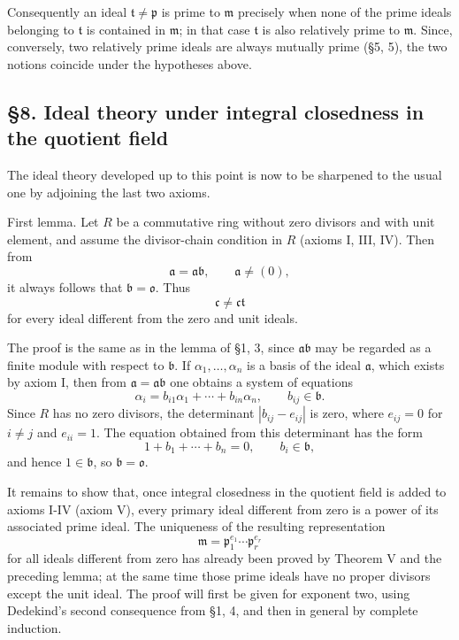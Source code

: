 \documentclass[
  12pt,
]{article}
\begin{document}
Consequently an ideal \(\mathfrak t\ne\mathfrak p\) is prime to
\(\mathfrak m\) precisely when none of the prime ideals belonging to
\(\mathfrak t\) is contained in \(\mathfrak m\); in that case
\(\mathfrak t\) is also relatively prime to \(\mathfrak m\). Since,
conversely, two relatively prime ideals are always mutually prime (§5,
5), the two notions coincide under the hypotheses above.

\subsection{§8. Ideal theory under integral closedness in the quotient
field}\label{ideal-theory-under-integral-closedness-in-the-quotient-field}

The ideal theory developed up to this point is now to be sharpened to
the usual one by adjoining the last two axioms.

First lemma. Let \(R\) be a commutative ring without zero divisors and
with unit element, and assume the divisor-chain condition in \(R\)
(axioms I, III, IV). Then from \[
  \mathfrak a=\mathfrak a\mathfrak b,
  \qquad \mathfrak a\ne(0),
\] it always follows that \(\mathfrak b=\mathfrak o\). Thus \[
  \mathfrak c\ne\mathfrak c\mathfrak t
\] for every ideal different from the zero and unit ideals.

The proof is the same as in the lemma of §1, 3, since
\(\mathfrak a\mathfrak b\) may be regarded as a finite module with
respect to \(\mathfrak b\). If \(\alpha_1,\ldots,\alpha_n\) is a basis
of the ideal \(\mathfrak a\), which exists by axiom I, then from
\(\mathfrak a=\mathfrak a\mathfrak b\) one obtains a system of equations
\[
  \alpha_i=b_{i1}\alpha_1+\cdots+b_{in}\alpha_n,
  \qquad b_{ij}\in\mathfrak b.
\] Since \(R\) has no zero divisors, the determinant \(|b_{ij}-e_{ij}|\)
is zero, where \(e_{ij}=0\) for \(i\ne j\) and \(e_{ii}=1\). The
equation obtained from this determinant has the form \[
  1+b_1+\cdots+b_n=0,
  \qquad b_i\in\mathfrak b,
\] and hence \(1\in\mathfrak b\), so \(\mathfrak b=\mathfrak o\).

It remains to show that, once integral closedness in the quotient field
is added to axioms I-IV (axiom V), every primary ideal different from
zero is a power of its associated prime ideal. The uniqueness of the
resulting representation \[
  \mathfrak m=\mathfrak p_1^{e_1}\cdots\mathfrak p_r^{e_r}
\] for all ideals different from zero has already been proved by Theorem
V and the preceding lemma; at the same time those prime ideals have no
proper divisors except the unit ideal. The proof will first be given for
exponent two, using Dedekind's second consequence from §1, 4, and then
in general by complete induction.
\end{document}
